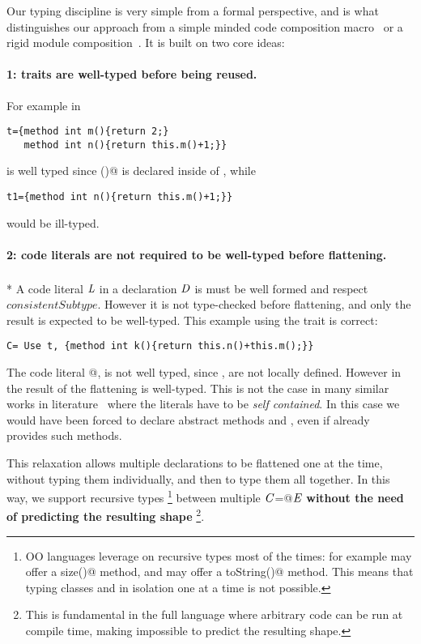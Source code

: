 Our typing discipline is very simple from a formal perspective,  
and is what distinguishes our approach from a simple minded code composition macro~\cite{bawden1999quasiquotation}
or a rigid module composition~\cite{ancona2002calculus}. 
It is built on two core ideas:

\paragraph{1: traits are \textbf{well-typed} before being reused.}
 For example in

\saveSpace\begin{lstlisting}
t={method int m(){return 2;} 
   method int n(){return this.m()+1;}}
\end{lstlisting}\saveSpace

\noindent \Q@t@ is well typed since \Q@m()@ is declared inside of \Q@t@, while

\saveSpace\begin{lstlisting}
t1={method int n(){return this.m()+1;}} 
\end{lstlisting}\saveSpace
\noindent would be ill-typed.

\paragraph{2: code literals are \textbf{not required to be well-typed} before flattening.}${}_{}$\\*
A code literal $\mathit{L}$ in a declaration $\mathit{D}$
is must be well formed and respect
$\mathit{consistentSubtype}$. However 
it is not type-checked before flattening,
and only the result is expected to be well-typed.
This example using the trait \Q@t@ is correct:

\saveSpace\begin{lstlisting}
C= Use t, {method int k(){return this.n()+this.m();}}
\end{lstlisting}\saveSpace

\noindent The code literal
@, 
is not well typed,
since \Q@n@, \Q@m@ are not locally defined. However in 
\name the result of the flattening is well-typed.
This is not the case in many similar works in literature~\cite{deep,Bettini2015282,Bergel2007} where the
literals have to be \emph{self contained}. In this case we would have been forced to
declare abstract methods \Q@n@ and \Q@m@, even if \Q@t@ already 
provides such methods.

This relaxation allows multiple declarations to be flattened one at the time, without typing them individually, and then to type them all together.
In this way, we support recursive types%
\footnote{
OO languages leverage on recursive types most of the times:
for example \Q@String@ may offer a \Q@Int size()@
method, and \Q@Int@ may offer a \Q@String toString()@ method.
This means that typing classes 
\Q@String@ and \Q@Int@ in isolation one at a time is not possible.}
between multiple $\mathit{C}$\Q@=@$\mathit{E}$ \textbf{without
the need of predicting the resulting shape}%
\footnote{This is fundamental in the full language where arbitrary code can be run at compile time, making impossible to predict the resulting shape.}.

